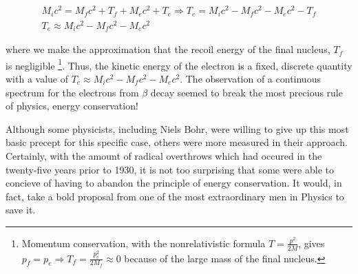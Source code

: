 \documentclass[a4paper,12pt]{book}
\begin{document}
\begin{multline}
 M_{i}c^{2}=M_{f}c^{2}+T_{f}+M_{e}c^{2}+T_{e} \Rightarrow T_{e}=M_{i}c^{2}-M_{f}c^{2}-M_{e}c^{2}-T_{f} \\  T_{e}\approx M_{i}c^{2}-M_{f}c^{2}-M_{e}c^{2}
\end{multline}

where we make the approximation that the recoil energy of the final nucleus, $T_{f}$ is negligible \footnote{Momentum conservation, with the nonrelativistic formula $T=\frac{p^{2}}{2M}$, gives $p_{f}=p_{e} \Rightarrow T_{f}=\frac{p_{e}^{2}}{2M_{f}}\approx0$ because of the large mass of the final nucleus.}. Thus, the kinetic energy of the electron is a fixed, discrete quantity with a value of $T_{e}\approx M_{i}c^{2}-M_{f}c^{2}-M_{e}c^{2}$. The observation of a continuous spectrum for the electrons from $\beta$ decay seemed to break the most precious rule of physics, energy conservation!

Although some physicists, including Niels Bohr, were willing to give up this most basic precept for this specific case, others were more measured in their approach. Certainly, with the amount of radical overthrows which had occured in the twenty-five years prior to 1930, it is not too surprising that some were able to concieve of having to abandon the principle of energy conservation. It would, in fact, take a bold proposal from one of the most extraordinary men in Physics to save it.
\end{document}
